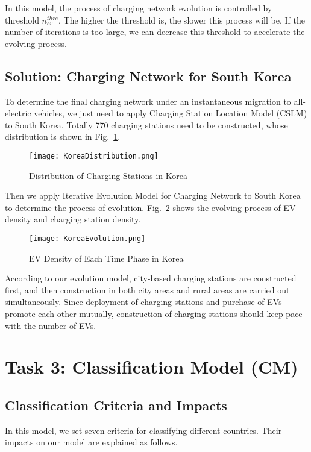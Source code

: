 \documentclass{mcmthesis}
\begin{document}
In this model, the process of charging network evolution is controlled by threshold $n_{ev}^{thre}$. The higher the threshold is, the slower this process will be. If the number of iterations is too large, we can decrease this threshold to accelerate the evolving process.
\subsection{Solution: Charging Network for South Korea}
To determine the final charging network under an instantaneous migration to all-electric vehicles, we just need to apply Charging Station Location Model (CSLM) to South Korea. Totally 770 charging stations need to be constructed, whose distribution is shown in Fig.~\ref{Fig-KoreaDistribution}.

\begin{figure}[htbp]
  \centering
  \texttt{[image: KoreaDistribution.png]}
  \caption{Distribution of Charging Stations in Korea}\label{Fig-KoreaDistribution}
\end{figure}

Then we apply Iterative Evolution Model for Charging Network to South Korea to determine the process of evolution. Fig.~\ref{Fig-KoreaEvolution} shows the evolving process of EV density and charging station density.

\begin{figure}[htbp]
  \centering
  \texttt{[image: KoreaEvolution.png]}
  \caption{EV Density of Each Time Phase in Korea}\label{Fig-KoreaEvolution}
\end{figure}

According to our evolution model, city-based charging stations are constructed first, and then construction in both city areas and rural areas are carried out simultaneously. Since deployment of charging stations and purchase of EVs promote each other mutually, construction of charging stations should keep pace with the number of EVs.
\section{Task 3: Classification Model (CM)}\label{Sec-Task3}
\subsection{Classification Criteria and Impacts}
In this model, we set seven criteria for classifying different countries. Their impacts on our model are explained as follows.
\end{document}
